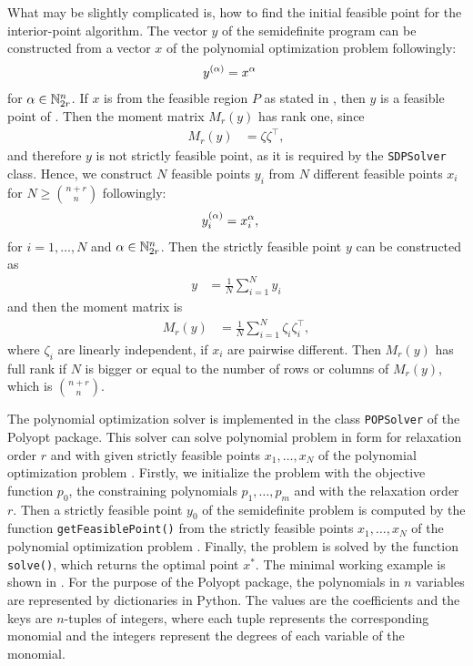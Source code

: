 What may be slightly complicated is, how to find the initial feasible point for the interior-point algorithm.
The vector $y$ of the semidefinite program  can be constructed from a vector $x$ of the polynomial optimization problem  followingly:
\begin{align}
  y^{(\alpha)} &= x^\alpha
\end{align}
for $\alpha \in \mathbb{N}^n_{2r}$.
If $x$ is from the feasible region $P$ as stated in , then $y$ is a feasible point of .
Then the moment matrix $M_r(y)$ has rank one, since
\begin{align}
  M_r(y) &= \zeta\zeta^\top,
\end{align}
and therefore $y$ is not strictly feasible point, as it is required by the \texttt{SDPSolver} class.
Hence, we construct $N$ feasible points $y_i$ from $N$ different feasible points $x_i$ for $N \geq {\binom{n+r}{n}}$ followingly:
\begin{align}
  y_i^{(\alpha)} &= x_i^\alpha,
\end{align}
for $i = 1,\ldots,N$ and $\alpha\in\mathbb{N}_{2r}^n$.
Then the strictly feasible point $y$ can be constructed as
\begin{align}
  y &= \frac{1}{N}\sum_{i=1}^Ny_i
\end{align}
and then the moment matrix is
\begin{align}
   M_r(y) &= \frac{1}{N} \sum_{i=1}^N \zeta_i\zeta_i^\top,
\end{align}
where $\zeta_i$ are linearly independent, if $x_i$ are pairwise different.
Then $M_r(y)$ has full rank if $N$ is bigger or equal to the number of rows or columns of $M_r(y)$, which is ${\binom{n+r}{n}}$.

The polynomial optimization solver is implemented in the class \texttt{POPSolver} of the Polyopt package.
This solver can solve polynomial problem in form  for relaxation order $r$ and with given strictly feasible points $x_1, \ldots, x_N$ of the polynomial optimization problem .
Firstly, we initialize the problem with the objective function $p_0$, the constraining polynomials $p_1, \ldots, p_m$ and with the relaxation order $r$.
Then a strictly feasible point $y_0$ of the semidefinite problem is computed by the function \texttt{getFeasiblePoint()} from the strictly feasible points $x_1, \ldots, x_N$ of the polynomial optimization problem .
Finally, the problem is solved by the function \texttt{solve()}, which returns the optimal point $x^*$.
The minimal working example is shown in .
For the purpose of the Polyopt package, the polynomials in $n$ variables are represented by dictionaries in Python.
The values are the coefficients and the keys are $n$-tuples of integers, where each tuple represents the corresponding monomial and the integers represent the degrees of each variable of the monomial.

